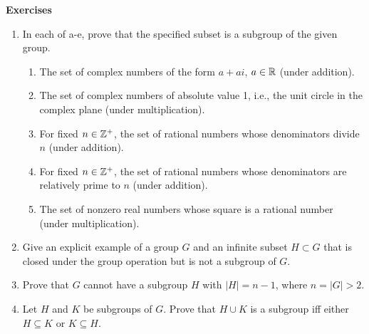 \documentclass[../main.tex]{subfiles}
\begin{document}
\textbf{Exercises}
\begin{enumerate}[label={\textbf{\arabic*.}}]
    \item In each of a-e, prove that the specified subset is a subgroup of the given group.
    \begin{enumerate}[label={\textbf{(\alph*)}}]
        \item The set of complex numbers of the form $a+ai$, $a\in\mathbb{R}$ (under addition).
        \item The set of complex numbers of absolute value 1, i.e., the unit circle in the complex plane (under multiplication).
        \item For fixed $n\in\mathbb{Z}^+$, the set of rational numbers whose denominators divide $n$ (under addition).
        \item For fixed $n\in\mathbb{Z}^+$, the set of rational numbers whose denominators are relatively prime to $n$ (under addition).
        \item The set of nonzero real numbers whose square is a rational number (under multiplication).
    \end{enumerate}
    \setcounter{enumi}{3}
    \item Give an explicit example of a group $G$ and an infinite subset $H\subset G$ that is closed under the group operation but is not a subgroup of $G$.
    \item Prove that $G$ cannot have a subgroup $H$ with $|H|=n-1$, where $n=|G|>2$.
    \setcounter{enumi}{7}
    \item Let $H$ and $K$ be subgroups of $G$. Prove that $H\cup K$ is a subgroup iff either $H\subseteq K$ or $K\subseteq H$.
\end{enumerate}
\end{document}
